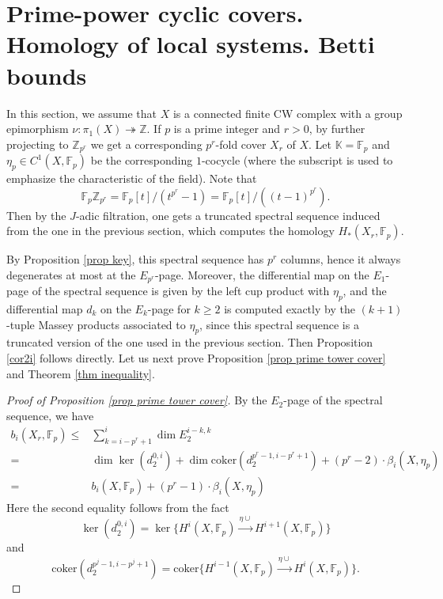 \documentclass[12pt,leqno,twoside]{amsart}
\theoremstyle{plain}
\theoremstyle{definition}
\newcommand{\Z}{\mathbb{Z}}
\newcommand{\K}{\mathbb{K}}
\newcommand{\F}{\mathbb{F}}
\newcommand{\coker}{\mathrm{coker}}
\begin{document}
\section{Prime-power cyclic covers. Homology of local systems. Betti bounds}\label{sec4}
In this section, we assume that $X$ is a connected finite CW complex with a group epimorphism $\nu \colon \pi_1(X)\twoheadrightarrow \Z$. If $p$ is a prime integer and $r>0$, by further projecting to $\Z_{p^r}$ we get a corresponding  $p^r$-fold cover $X_r$ of $X$. 
Let $\K=\F_p$ and $\eta_p \in C^1(X,\F_p)$ be the corresponding $1$-cocycle (where the subscript is used to emphasize the characteristic of the field).
Note that  $$\F_p \Z_{p^r}=\F_p[t]/(t^{p^r}-1)=\F_p[t]/((t-1)^{p^r}).$$ Then by the $J$-adic filtration, one gets a truncated spectral sequence induced from the one in the previous section, which computes the homology $H_*(X_r,\F_p)$. 

By Proposition \ref{prop key},  this spectral sequence has $p^r$ columns, hence it always degenerates at most at the $E_{p^r}$-page. Moreover,  the differential map on the $E_1$-page of the spectral sequence 
is given by the left cup product with $\eta_p$, 
and 
 the differential map $d_k$ on the $E_k$-page for $k\geq 2$ is computed  exactly by the $(k+1)$-tuple Massey products associated to $\eta_p$, since this spectral sequence is a truncated version of the one used in the previous section. Then Proposition \ref{cor2i} follows directly. 
Let us next prove Proposition \ref{prop prime tower cover} and Theorem \ref{thm inequality}.
\begin{proof}[Proof of Proposition \ref{prop prime tower cover}]
By the $E_2$-page of the spectral sequence, we have
\begin{align*}
          b_i(X_r,\F_p) \leq & \sum_{k=i-p^r+1}^i \dim E_2^{i-k,k} \\
                   =   &  \dim \ker(d_2^{0,i})+\dim \coker(d_2^{p^r-1,i-p^r+1})+ (p^r-2)\cdot   \beta_i(X,\eta_p)\\
                   =   & b_i(X,\F_p) + (p^r-1)\cdot   \beta_i(X,\eta_p)
\end{align*}
Here the second equality follows from the fact $$\ker(d_2^{0,i})=\ker \{ H^i(X,\F_p) \xrightarrow{\eta \cup} H^{i+1}(X,\F_p)\} $$
and $$ \coker(d_2^{p^j-1,i-p^j+1})=\coker \{ H^{i-1}(X,\F_p) \xrightarrow{\eta \cup} H^{i}(X,\F_p)\}.$$
\end{proof}
\end{document}
